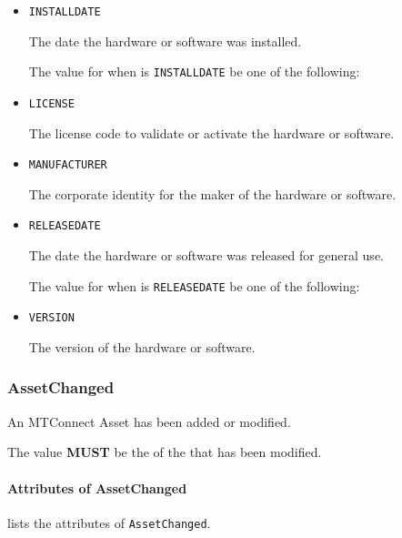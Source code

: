 \begin{itemize}

\item \texttt{INSTALL\textunderscore DATE}


The date the hardware or software was installed.


The value for  when  is \texttt{INSTALL\textunderscore DATE} \MUST be one of the following: 

\item \texttt{LICENSE}


The license code to validate or activate the hardware or software.

\item \texttt{MANUFACTURER}


The corporate identity for the maker of the hardware or software.


\item \texttt{RELEASE\textunderscore DATE}


The date the hardware or software was released for general use.



The value for  when  is \texttt{RELEASE\textunderscore DATE} \MUST be one of the following: 

\item \texttt{VERSION}


The version of the hardware or software.


\end{itemize}








\subsubsection{AssetChanged}
\label{sec:AssetChanged}



An \gls{MTConnect Asset} has been added or modified.

The value \textbf{MUST} be the  of the  that has been modified.


\paragraph{Attributes of AssetChanged}\mbox{}
\label{sec:Attributes of AssetChanged}

 lists the attributes of \texttt{AssetChanged}.

